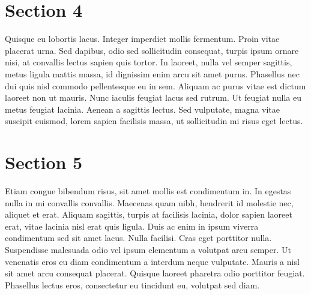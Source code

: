 \documentclass[../thesis.tex]{subfiles}
\begin{document}
\section{Section 4}
Quisque eu lobortis lacus. Integer imperdiet mollis fermentum. Proin vitae placerat urna. Sed dapibus, odio sed sollicitudin consequat, turpis ipsum ornare nisi, at convallis lectus sapien quis tortor. In laoreet, nulla vel semper sagittis, metus ligula mattis massa, id dignissim enim arcu sit amet purus. Phasellus nec dui quis nisl commodo pellentesque eu in sem. Aliquam ac purus vitae est dictum laoreet non ut mauris. Nunc iaculis feugiat lacus sed rutrum. Ut feugiat nulla eu metus feugiat lacinia. Aenean a sagittis lectus. Sed vulputate, magna vitae suscipit euismod, lorem sapien facilisis massa, ut sollicitudin mi risus eget lectus.

\section{Section 5}
Etiam congue bibendum risus, sit amet mollis est condimentum in. In egestas nulla in mi convallis convallis. Maecenas quam nibh, hendrerit id molestie nec, aliquet et erat. Aliquam sagittis, turpis at facilisis lacinia, dolor sapien laoreet erat, vitae lacinia nisl erat quis ligula. Duis ac enim in ipsum viverra condimentum sed sit amet lacus. Nulla facilisi. Cras eget porttitor nulla. Suspendisse malesuada odio vel ipsum elementum a volutpat arcu semper. Ut venenatis eros eu diam condimentum a interdum neque vulputate. Mauris a nisl sit amet arcu consequat placerat. Quisque laoreet pharetra odio porttitor feugiat. Phasellus lectus eros, consectetur eu tincidunt eu, volutpat sed diam.

%
%
\end{document}
